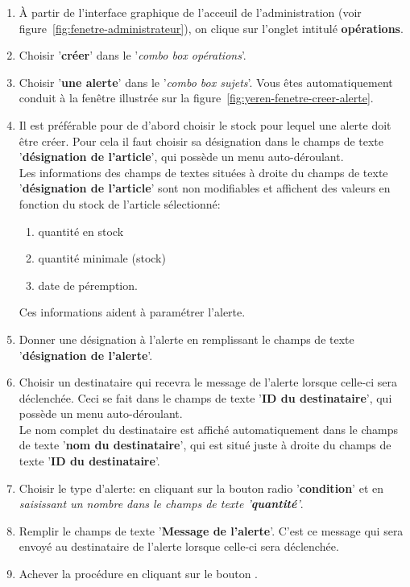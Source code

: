 \begin{enumerate}[1)]
	\item \`A partir de l'interface graphique de l'acceuil de
		l'administration (voir figure~\ref{fig:fenetre-administrateur}),
		on clique sur l'onglet intitul\'e \textbf{op\'erations}. 
		
	\item Choisir '\textbf{cr\'eer}' dans le '\emph{combo box
		op\'erations}'.
		
	\item Choisir '\textbf{une alerte}' dans le '\emph{combo box
		sujets}'. Vous \^etes automatiquement conduit \`a la fen\^etre
		illustr\'ee sur la figure~\ref{fig:yeren-fenetre-creer-alerte}.	
		
	\item Il est pr\'ef\'erable pour de d'abord	choisir le stock
		pour lequel une alerte doit \^etre cr\'eer.	Pour cela il
		faut choisir sa d\'esignation dans le champs de texte
		'\textbf{d\'esignation de l'article}', qui poss\`ede un
		menu auto-d\'eroulant.\\

		Les informations des champs de textes situ\'ees \`a
		droite du champs de texte '\textbf{d\'esignation de l'article}'
		sont non modifiables et affichent des valeurs en fonction
		du stock de l'article s\'electionn\'e:
		\begin{enumerate} [1)]
			\item quantit\'e en stock
			\item quantit\'e minimale (stock)
			\item date de p\'eremption.		
		\end{enumerate}

		Ces informations aident \`a param\'etrer l'alerte.

	\item Donner une d\'esignation \`a l'alerte	en remplissant
		le champs de texte '\textbf{d\'esignation de l'alerte}'.
		
	\item Choisir un destinataire qui recevra le message de
		l'alerte lorsque celle-ci sera d\'eclench\'ee.
		Ceci se fait dans le champs de texte '\textbf{ID du destinataire}',
		qui poss\`ede un menu auto-d\'eroulant.\\
		
		Le nom complet du destinataire est affich\'e automatiquement
		dans le champs de texte '\textbf{nom du destinataire}',
		qui est situ\'e juste \`a droite du champs de texte
		'\textbf{ID du destinataire}'.
		
	\item Choisir le type d'alerte:	
		en cliquant sur la bouton radio '\textbf{condition}' et 
		en \emph{saisissant un nombre dans le champs de texte
		'\textbf{quantit\'e}'}.
		
	\item Remplir le champs de texte '\textbf{Message de l'alerte}'.
		C'est ce message qui sera envoy\'e au destinataire de
		l'alerte lorsque celle-ci sera d\'eclench\'ee.	
		
	\item Achever la proc\'edure en cliquant sur le bouton .
\end{enumerate}

